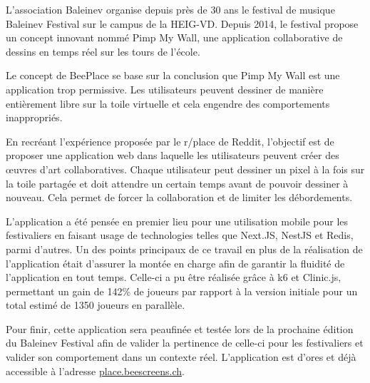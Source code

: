 L'association Baleinev organise depuis près de 30 ans le festival de musique Baleinev Festival sur le campus de la HEIG-VD. Depuis 2014, le festival propose un concept innovant nommé Pimp My Wall, une application collaborative de dessins en temps réel sur les tours de l'école.

Le concept de BeePlace se base sur la conclusion que Pimp My Wall est une application trop permissive. Les utilisateurs peuvent dessiner de manière entièrement libre sur la toile virtuelle et cela engendre des comportements inappropriés.

En recréant l'expérience proposée par le r/place de Reddit, l'objectif est de proposer une application web dans laquelle les utilisateurs peuvent créer des œuvres d'art collaboratives. Chaque utilisateur peut dessiner un pixel à la fois sur la toile partagée et doit attendre un certain temps avant de pouvoir dessiner à nouveau. Cela permet de forcer la collaboration et de limiter les débordements.

L'application a été pensée en premier lieu pour une utilisation mobile pour les festivaliers en faisant usage de technologies telles que Next.JS, NestJS et Redis, parmi d'autres.
Un des points principaux de ce travail en plus de la réalisation de l'application était d'assurer la montée en charge afin de garantir la fluidité de l'application en tout temps. Celle-ci a pu être réalisée grâce à k6 et Clinic.js, permettant un gain de 142\% de joueurs par rapport à la version initiale pour un total estimé de 1350 joueurs en parallèle.

Pour finir, cette application sera peaufinée et testée lors de la prochaine édition du Baleinev Festival afin de valider la pertinence de celle-ci pour les festivaliers et valider son comportement dans un contexte réel. L'application est d'ores et déjà accessible à l'adresse \href{https://place.beescreens.ch}{place.beescreens.ch}.
